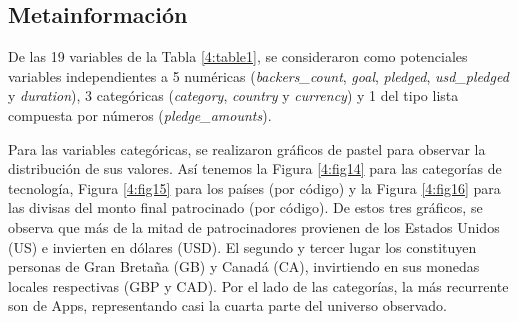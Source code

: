 \subsection{Metainformación}
De las 19 variables de la Tabla \ref{4:table1}, se consideraron como potenciales variables independientes a 5 numéricas (\textit{backers\_count}, \textit{goal}, \textit{pledged}, \textit{usd\_pledged} y \textit{duration}), 3 categóricas (\textit{category}, \textit{country} y \textit{currency}) y 1 del tipo lista compuesta por números (\textit{pledge\_amounts}).

Para las variables categóricas, se realizaron gráficos de pastel para observar la distribución de sus valores. Así tenemos la Figura \ref{4:fig14} para las categorías de tecnología, Figura \ref{4:fig15} para los países (por código) y la Figura \ref{4:fig16} para las divisas del monto final patrocinado (por código). De estos tres gráficos, se observa que más de la mitad de patrocinadores provienen de los Estados Unidos (US) e invierten en dólares (USD). El segundo y tercer lugar los constituyen personas de Gran Bretaña (GB) y Canadá (CA), invirtiendo en sus monedas locales respectivas (GBP y CAD). Por el lado de las categorías, la más recurrente son de Apps, representando casi la cuarta parte del universo observado.

